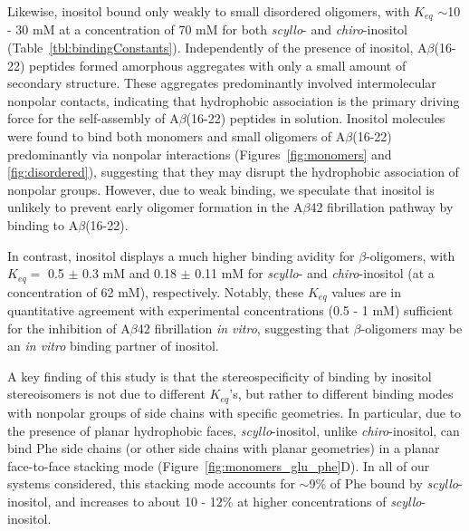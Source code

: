 Likewise, inositol bound only weakly to small disordered oligomers, with $K_{eq}$ $\sim$10 - 30 mM at a concentration of 70 mM for both \emph{scyllo}- and \emph{chiro}-inositol (Table~\ref{tbl:bindingConstants}). Independently of the presence of inositol,  A$\beta$(16-22) peptides formed amorphous aggregates with only a small amount of secondary structure. These aggregates predominantly involved intermolecular nonpolar contacts, 
indicating that hydrophobic association is the primary driving force for the self-assembly of A$\beta$(16-22) peptides in solution. Inositol molecules were found to bind both monomers and small oligomers of A$\beta$(16-22) predominantly via nonpolar interactions (Figures~{\ref{fig:monomers}} and {\ref{fig:disordered}}),  suggesting that they may disrupt the hydrophobic association of nonpolar groups. However, due to weak binding, we speculate that inositol is unlikely to prevent early oligomer formation in the A$\beta$42 fibrillation pathway by binding to A$\beta$(16-22).

In contrast, inositol displays a much higher binding avidity for $\beta$-oligomers, with $K_{eq}=$ 0.5 $\pm$ 0.3 mM and  0.18 $\pm$ 0.11 mM for \emph{scyllo}- and \emph{chiro}-inositol (at a concentration of 62 mM), respectively. Notably, these $K_{eq}$ values are in quantitative agreement with experimental concentrations (0.5 - 1 mM) sufficient for the inhibition of A$\beta$42 fibrillation \emph{in vitro},\cite{McLaurin:2000p64} suggesting that $\beta$-oligomers may be an \emph{in vitro} binding partner of inositol.

A key finding of this study is that the stereospecificity of binding by inositol stereoisomers is not due to different $K_{eq}$'s, but rather to different binding modes with nonpolar groups of side chains with specific geometries. In particular, due to the presence of planar hydrophobic faces, \emph{scyllo}-inositol, unlike \emph{chiro}-inositol, can bind Phe side chains (or other side chains with planar geometries) in a planar face-to-face stacking mode (Figure~\ref{fig:monomers_glu_phe}D). In all of our systems considered, this stacking mode accounts for $\sim$9\% of Phe bound by \emph{scyllo}-inositol, and increases to about 10 - 12\% at higher concentrations of \emph{scyllo}-inositol.

